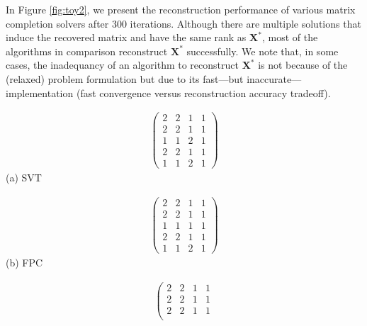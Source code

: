 \documentclass[twocolumn]{svjour3}
\newcommand{\bestsignal}{\boldsymbol{X}^\ast}
\begin{document}
In Figure \ref{fig:toy2}, we present the reconstruction performance of various matrix completion solvers after 300 iterations. Although there are multiple solutions that induce the recovered matrix and have the same rank as $\bestsignal$, most of the algorithms in comparison reconstruct $\bestsignal$ successfully. We note that, in some cases, the inadequancy of an algorithm to reconstruct $\bestsignal$ is not because of the (relaxed) problem formulation but due to its fast---but inaccurate---implementation (fast convergence versus reconstruction accuracy tradeoff).

\begin{figure*}[ht]
\hspace{1.5cm}\begin{minipage}[c]{0.15\linewidth}
\centering
\begin{align}
\left( \begin{array}{cccc}
2 & 2 & 1 & 1 \\
2 & 2 & 1 & 1 \\
1 & 1 & 2 & 1 \\
2 & 2 & 1 & 1 \\
1 & 1 & 2 & 1 \end{array} \right) \nonumber 
\end{align} \hspace{-1.1cm} (a) SVT
\end{minipage}
\hspace{0.4cm}
\begin{minipage}[c]{0.15\linewidth}
\centering
\begin{align}
\left( \begin{array}{cccc}
2 & 2 & 1 & 1 \\
2 & 2 & 1 & 1 \\
1 & 1 & 1 & 1 \\
2 & 2 & 1 & 1 \\
1 & 1 & 2 & 1 \end{array} \right) \nonumber 
\end{align} \hspace{-1.1cm} (b) FPC
\end{minipage}
\hspace{0.4cm}
\begin{minipage}[c]{0.15\linewidth}
\centering
\begin{align}
\left( \begin{array}{cccc}
2 & 2 & 1 & 1 \\
2 & 2 & 1 & 1 \\
2 & 2 & 1 & 1 \\

\end{array}
\end{align}
\end{minipage}
\end{figure*}
\end{document}

